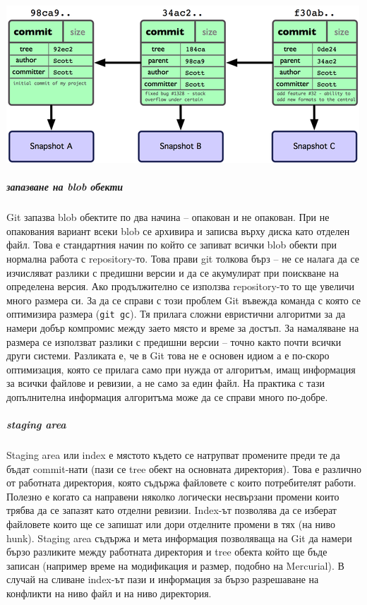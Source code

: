 \documentclass[a4paper]{article}
\begin{document}
      \vspace{8 mm}
      \begin{center}
        \includegraphics[scale=1.0]{git_commits.png}
      \end{center}

      \subparagraph{запазване на blob обекти} Git запазва blob обектите по два
      начина -- опакован и не опакован. При не опакования вариант всеки blob се
      архивира и записва върху диска като отделен файл. Това е стандартния
      начин по който се запиват всички blob обекти при нормална работа
      с repository-то. Това прави git толкова бърз -- не се налага да се
      изчисляват разлики с предишни версии и да се акумулират при поискване на
      определена версия. Ако продължително се използва repository-то то ще
      увеличи много размера си. За да се справи с този проблем Git въвежда
      команда с която се оптимизира размера (\texttt{git gc}). Тя прилага
      сложни евристични алгоритми за да намери добър компромис между заето
      място и време за достъп. За намаляване на размера се използват разлики
      с предишни версии -- точно както почти всички други системи. Разликата е,
      че в Git това не е основен идиом а е по-скоро оптимизация, която се
      прилага само при нужда от алгоритъм, имащ информация за всички файлове
      и ревизии, а не само за един файл. На практика с тази допълнителна
      информация алгоритъма може да се справи много по-добре.

      \subparagraph{staging area} Staging area или index е мястото където се
      натрупват промените преди те да бъдат commit-нати (пази се tree обект на
      основната директория). Това е различно от работната директория, която
      съдържа файловете с които потребителят работи. Полезно е когато са
      направени няколко логически несвързани промени които трябва да се запазят
      като отделни ревизии. Index-ът позволява да се изберат файловете които
      ще се запишат или дори отделните промени в тях (на ниво hunk).
      Staging area съдържа и мета информация позволяваща на Git да намери бързо
      разликите между работната директория и tree обекта който ще бъде
      записан (например време на модификация и размер, подобно на Mercurial).
      В случай на сливане index-ът пази и информация за бързо разрешаване на
      конфликти на ниво файл и на ниво директория.
\end{document}
